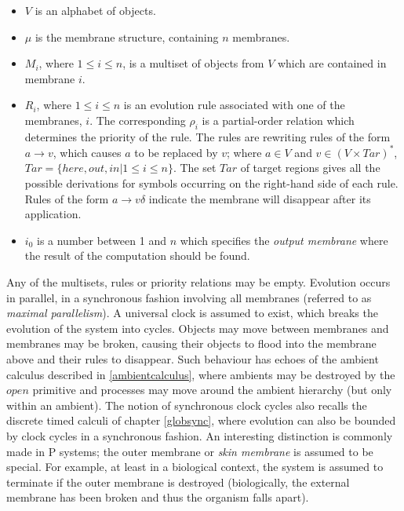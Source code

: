 \begin{itemize}
\item $V$ is an alphabet of objects.
\item $\mu$ is the membrane structure, containing $n$ membranes.
\item $M_i$, where $1 \le i \le n$, is a multiset of objects from $V$
      which are contained in membrane $i$.
\item $R_i$, where $1 \le i \le n$ is an evolution rule associated
  with one of the membranes, $i$. The corresponding $\rho_i$ is a
  partial-order relation which determines the priority of the rule.
  The rules are rewriting rules of the form $a \rightarrow v$, which
  causes $a$ to be replaced by $v$; where $a \in V$ and $v \in (V
  \times Tar)^*$, $Tar = \{here, out, in | 1 \le i \le n\}$.  The set
  $Tar$ of target regions gives all the possible derivations for
  symbols occurring on the right-hand side of each rule.  Rules of the
  form $a \rightarrow v\delta$ indicate the membrane will disappear
  after its application.
\item $i_0$ is a number between 1 and $n$ which specifies the
  \emph{output membrane} where the result of the computation should be
  found.
\end{itemize}

\noindent Any of the multisets, rules or priority relations may be
empty.  Evolution occurs in parallel, in a synchronous fashion
involving all membranes (referred to as \emph{maximal parallelism}).
A universal clock is assumed to exist, which breaks the evolution of
the system into cycles.  Objects may move between membranes and
membranes may be broken, causing their objects to flood into the
membrane above and their rules to disappear.  Such behaviour has
echoes of the ambient calculus described in \ref{ambientcalculus},
where ambients may be destroyed by the $open$ primitive and processes
may move around the ambient hierarchy (but only within an ambient).
The notion of synchronous clock cycles also recalls the discrete timed
calculi of chapter \ref{globsync}, where evolution can also be bounded
by clock cycles in a synchronous fashion.  An interesting distinction
is commonly made in P systems; the outer membrane or \emph{skin
  membrane} is assumed to be special.  For example, at least in a
biological context, the system is assumed to terminate if the outer
membrane is destroyed (biologically, the external membrane has been
broken and thus the organism falls apart).

